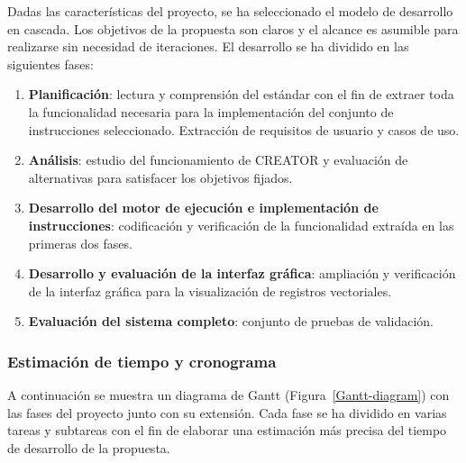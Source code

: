Dadas las características del proyecto, se ha seleccionado el modelo de desarrollo en cascada. Los objetivos de la propuesta son claros y el alcance es asumible para realizarse sin necesidad de iteraciones. El desarrollo se ha dividido en las siguientes fases:
\begin{enumerate}
    \item \textbf{Planificación}: lectura y comprensión del estándar con el fin de extraer toda la funcionalidad necesaria para la implementación del conjunto de instrucciones seleccionado. Extracción de requisitos de usuario y casos de uso.
    \item \textbf{Análisis}: estudio del funcionamiento de CREATOR y evaluación de alternativas para satisfacer los objetivos fijados.
    \item \textbf{Desarrollo del motor de ejecución e implementación de instrucciones}: codificación y verificación de la funcionalidad extraída en las primeras dos fases.
    \item \textbf{Desarrollo y evaluación de la interfaz gráfica}: ampliación y verificación de la interfaz gráfica para la visualización de registros vectoriales.
    \item \textbf{Evaluación del sistema completo}: conjunto de pruebas de validación.
\end{enumerate}

\subsubsection{Estimación de tiempo y cronograma}\label{subsec:Gantt-diagram}
A continuación se muestra un diagrama de Gantt (Figura~\ref{Gantt-diagram}) con las fases del proyecto junto con su extensión. Cada fase se ha dividido en varias tareas y subtareas con el fin de elaborar una estimación más precisa del tiempo de desarrollo de la propuesta.

